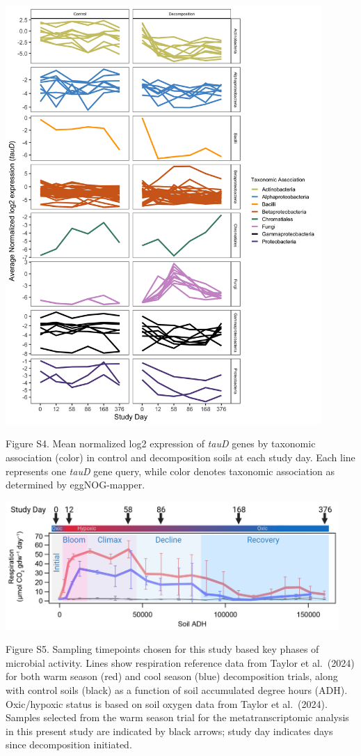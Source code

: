 \documentclass[
  letterpaper,
  DIV=11,
  numbers=noendperiod]{scrartcl}
\begin{document}
\includegraphics[width=0.9\textwidth]{../../figures/tauD_nlog2_taxonomy.png}

Figure S4. Mean normalized log2 expression of \emph{tauD} genes by
taxonomic association (color) in control and decomposition soils at each
study day. Each line represents one \emph{tauD} gene query, while color
denotes taxonomic association as determined by eggNOG-mapper.

\pagebreak

\includegraphics[width=0.95\textwidth]{../../figures/phases_MetaTsamples.png}

Figure S5. Sampling timepoints chosen for this study based key phases of
microbial activity. Lines show respiration reference data from Taylor et
al.~(2024) for both warm season (red) and cool season (blue)
decomposition trials, along with control soils (black) as a function of
soil accumulated degree hours (ADH). Oxic/hypoxic status is based on
soil oxygen data from Taylor et al.~(2024). Samples selected from the
warm season trial for the metatranscriptomic analysis in this present
study are indicated by black arrows; study day indicates days since
decomposition initiated.
\end{document}
